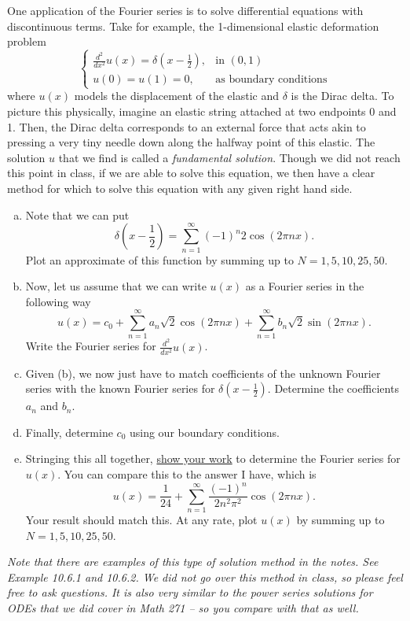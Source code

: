 \documentclass[12pt]{amsbook}
\begin{document}
\newpage
\begin{problem}
One application of the Fourier series is to solve differential equations with discontinuous terms. Take for example, the 1-dimensional elastic deformation problem
\[
\begin{cases}
    \frac{d^2}{dx^2}u(x) = \delta\left(x-\frac{1}{2}\right), & \textrm{in $(0,1)$}\\
    u(0)=u(1)=0, &\textrm{as boundary conditions}
\end{cases}
\]
where $u(x)$ models the displacement of the elastic and $\delta$ is the Dirac delta. To picture this physically, imagine an elastic string attached at two endpoints 0 and 1. Then, the Dirac delta corresponds to an external force that acts akin to pressing a very tiny needle down along the halfway point of this elastic. The solution $u$ that we find is called a \emph{fundamental solution}. Though we did not reach this point in class, if we are able to solve this equation, we then have a clear method for which to solve this equation with any given right hand side. 
\begin{enumerate}[(a)]
    \item Note that we can put
    \[
    \delta\left( x - \frac{1}{2} \right) = \sum_{n=1}^\infty (-1)^n 2 \cos(2\pi n x).
    \]
    Plot an approximate of this function by summing up to $N=1,5,10,25,50$. 
    \item Now, let us assume that we can write $u(x)$ as a Fourier series in the following way
    \[
    u(x) = c_0 + \sum_{n=1}^\infty a_n \sqrt{2}\cos(2\pi n x) + \sum_{n=1}^\infty b_n \sqrt{2}\sin(2\pi n x).
    \]
    Write the Fourier series for $\frac{d^2}{dx^2}u(x)$.
    \item Given (b), we now just have to match coefficients of the unknown Fourier series with the known Fourier series for $\delta\left( x - \frac{1}{2}\right)$. Determine the coefficients $a_n$ and $b_n$.
    \item Finally, determine $c_0$ using our boundary conditions.
    \item Stringing this all together, \underline{show your work} to determine the Fourier series for $u(x)$. You can compare this to the answer I have, which is
    \[
    u(x) = \frac{1}{24} + \sum_{n=1}^\infty \frac{(-1)^n}{2n^2\pi^2} \cos(2\pi n x).
    \]
    Your result should match this. At any rate, plot $u(x)$ by summing up to $N=1,5,10,25,50$.
\end{enumerate}
\emph{Note that there are examples of this type of solution method in the notes. See Example 10.6.1 and 10.6.2. We did not go over this method in class, so please feel free to ask questions. It is also very similar to the power series solutions for ODEs that we did cover in Math 271 -- so you compare with that as well.}
\end{problem}
\end{document}
